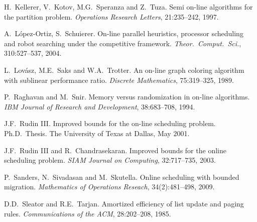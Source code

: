 \documentclass{llncs}
\begin{document}
\begin{thebibliography}{10}
H.\ Kellerer, V.\ Kotov, M.G.\ Speranza and Z.\ Tuza. Semi on-line algorithms for the 
partition problem. {\em  Operations Research Letters\/}, 21:235--242, 1997.

A.\ L\'opez-Ortiz, S.\ Schuierer. On-line parallel heuristics, processor scheduling and robot searching 
under the competitive framework. {\em Theor.\ Comput.\ Sci.\/}, 310:527--537, 2004.

L.\ Lov\'asz, M.E.\ Saks and W.A.\ Trotter. An on-line graph coloring algorithm with sublinear 
performance ratio. {\em Discrete Mathematics\/}, 75:319--325, 1989. 

P.\ Raghavan and M.\ Snir. Memory versus randomization in on-line algorithms. {\em IBM Journal of Research 
and Development\/}, 38:683--708, 1994.

J.F.\ Rudin III. Improved bounds for the on-line scheduling problem.
Ph.D.\ Thesis. The University of Texas at Dallas, May 2001.

J.F.\ Rudin III and R.\ Chandrasekaran. Improved bounds for the online scheduling problem. 
{\em SIAM Journal on Computing\/}, 32:717--735, 2003.

P.\ Sanders, N.\ Sivadasan and M.\ Skutella. Online scheduling with bounded migration. {\em Mathematics
of Operations Reseach\/}, 34(2):481--498, 2009.

D.D.~Sleator and R.E.~Tarjan. Amortized efficiency of list update and
paging rules. {\em Communications of the ACM}, 28:202--208, 1985.

\end{thebibliography}
\end{document}
